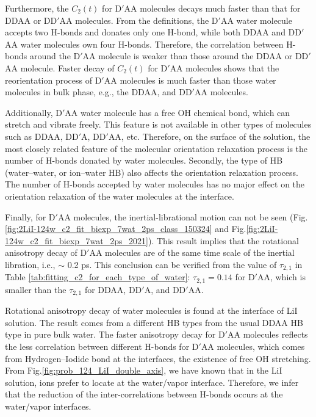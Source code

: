 Furthermore, the $C_2(t)$ for D$'$AA molecules decays much faster than that for DDAA or DD$'$AA molecules.
From the definitions, the D$'$AA water molecule accepts two H-bonds and donates only one H-bond, 
while both DDAA and DD$'$AA water molecules own four H-bonds.
Therefore, the correlation between H-bonds around the D$'$AA molecule is weaker than those around the DDAA or DD$'$AA molecule. 
Faster decay of $C_2(t)$ for D$'$AA molecules shows that the reorientation process of D$'$AA
molecules is much faster than those water molecules in bulk phase, e.g., the DDAA, and DD$'$AA molecules.

Additionally, D$'$AA water molecule has a free OH chemical bond, which can stretch and vibrate freely. 
This feature is not available in other types of molecules such as DDAA, DD$'$A, DD$'$AA, etc. 
Therefore, on the surface of the solution, the most closely related feature of the molecular orientation relaxation process is 
the number of H-bonds donated by water molecules. Secondly, the type of HB (water--water, or ion--water HB) 
also affects the orientation relaxation process. The number of H-bonds accepted by water molecules has no major effect on the orientation relaxation 
of the water molecules at the interface.

Finally, for D$'$AA molecules, the inertial-librational motion can not be seen (Fig.\thinspace\ref{fig:2LiI-124w_c2_fit_biexp_7wat_2ps_class_150324} 
and Fig.\thinspace\ref{fig:2LiI-124w_c2_fit_biexp_7wat_2ps_2021}). 
This result implies that the rotational anisotropy decay of D$'$AA molecules
are of the same time scale of the inertial libration, i.e., $\sim$ 0.2 ps. 
This conclusion can be verified from the value of $\tau_{2,1}$ in Table \ref{tab:fitting_c2_for_each_type_of_water}: $\tau_{2,1}=0.14$ for D$'$AA, 
which is smaller than the $\tau_{2,1}$ for DDAA, DD$'$A, and DD$'$AA.

Rotational anisotropy decay of water molecules is found at the interface of LiI solution. 
The result comes from a different HB types from the usual DDAA HB type in pure bulk water.
The faster anisotropy decay for D$'$AA molecules reflects the less correlation between different H-bonds for D$'$AA molecules, 
which comes from Hydrogen--Iodide bond at the interfaces, the existence of free OH stretching.
From Fig.\space\ref{fig:prob_124_LiI_double_axis}, we have known that in the LiI solution, 
\I ions prefer to locate at the water/vapor interface.  
Therefore, we infer that the reduction of the inter-correlations between H-bonds occurs at the water/vapor interfaces. 

